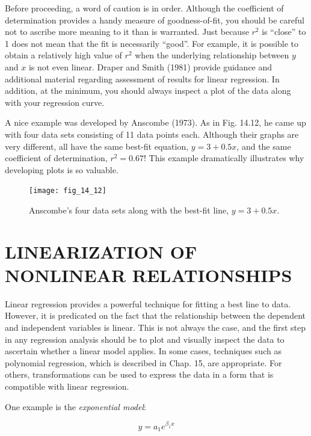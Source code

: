 \documentclass[../main.tex]{subfiles}
\begin{document}
Before proceeding, a word of caution is in order. Although the coefficient of determination provides a handy measure of goodness-of-fit, you should be careful not to ascribe more meaning to it than is warranted. Just because $r^2$ is ``close'' to 1 does not mean that the fit is necessarily ``good''. For example, it is possible to obtain a relatively high value of $r^2$ when the underlying relationship between $y$ and $x$ is not even linear. Draper and Smith (1981) provide guidance and additional material regarding assessment of results for linear regression. In addition, at the minimum, you should always inspect a plot of the data along with your regression curve.

A nice example was developed by Anscombe (1973). As in Fig. 14.12, he came up with four data sets consisting of 11 data points each. Although their graphs are very different, all have the same best-fit equation, $y = 3 + 0.5 x$, and the same coefficient of determination, $r^2 = 0.67$! This example dramatically illustrates why developing plots is so valuable.

\begin{figure}[H]
	\centering
	\texttt{[image: fig\_14\_12]}
	\caption{\textsf{Anscombe's four data sets along with the best-fit line, $y = 3 + 0.5x$.}}
	\label{fig:fig_14_12}
\end{figure}


\label{cha:cha_P_14_4}
\section{LINEARIZATION OF NONLINEAR RELATIONSHIPS}

Linear regression provides a powerful technique for fitting a best line to data. However, it is predicated on the fact that the relationship between the dependent and independent variables is linear. This is not always the case, and the first step in any regression analysis should be to plot and visually inspect the data to ascertain whether a linear model applies. In some cases, techniques such as polynomial regression, which is described in Chap. 15, are appropriate. For others, transformations can be used to express the data in a form that is compatible with linear regression.

One example is the \textit{exponential model}:

\begin{equation}
	\tag{14.22}
	y = a_1 e^{\beta_1 x}
\end{equation}
\end{document}
